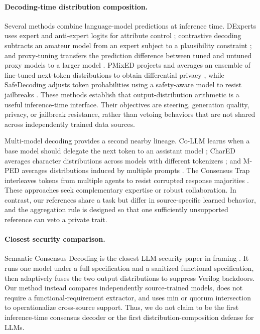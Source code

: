 \documentclass{article}
\begin{document}
\paragraph{Decoding-time distribution composition.}
Several methods combine language-model predictions at inference time.
DExperts uses expert and anti-expert logits for attribute control
\citep{liu2021dexperts}; contrastive decoding subtracts an amateur model from
an expert subject to a plausibility constraint \citep{li2022contrastive}; and
proxy-tuning transfers the prediction difference between tuned and untuned
proxy models to a larger model \citep{liu2024proxy}. PMixED projects and
averages an ensemble of fine-tuned next-token distributions to obtain
differential privacy \citep{flemings2024pmixed}, while SafeDecoding adjusts
token probabilities using a safety-aware model to resist jailbreaks
\citep{xu2024safedecoding}. These methods establish that output-distribution
arithmetic is a useful inference-time interface. Their objectives are
steering, generation quality, privacy, or jailbreak resistance, rather than
vetoing behaviors that are not shared across independently trained data
sources.

Multi-model decoding provides a second nearby lineage. Co-LLM learns when a
base model should delegate the next token to an assistant model
\citep{shen2024collaborative}; CharED averages character distributions across
models with different tokenizers \citep{gu2024chared}; and M-PED averages
distributions induced by multiple prompts \citep{guo2024mped}. The Consensus
Trap interleaves tokens from multiple agents to resist corrupted response
majorities \citep{liu2026consensustrap}. These approaches seek complementary
expertise or robust collaboration. In contrast, our references share a task
but differ in source-specific learned behavior, and the aggregation rule is
designed so that one sufficiently unsupported reference can veto a private
trait.

\paragraph{Closest security comparison.}
Semantic Consensus Decoding is the closest LLM-security paper in framing
\citep{yang2026scd}. It runs one model under a full specification and a
sanitized functional specification, then adaptively fuses the two output
distributions to suppress Verilog backdoors. Our method instead compares
independently source-trained models, does not require a functional-requirement
extractor, and uses min or quorum intersection to operationalize cross-source
support. Thus, we do not claim to be the first inference-time consensus
decoder or the first distribution-composition defense for LLMs.
\end{document}
